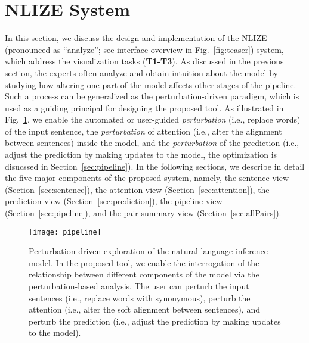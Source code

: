 

\section{NLIZE System}
In this section, we discuss the design and implementation of the NLIZE (pronounced as ``analyze''; see interface overview in Fig.~\ref{fig:teaser}) system, which address the visualization tasks (\textbf{T1-T3}).
%
As discussed in the previous section, the experts often analyze and obtain intuition about the model by studying how altering one part of the model affects other stages of the pipeline.
%
Such a process can be generalized as the perturbation-driven paradigm, which is used as a guiding principal for designing the proposed tool.
%
As illustrated in Fig.~\ref{fig:modelPipeline}, we enable the automated or user-guided \emph{perturbation} (i.e., replace words) of the input sentence, the \emph{perturbation} of attention (i.e., alter the alignment between sentences) inside the model, and the \emph{perturbation} of the prediction (i.e., adjust the prediction by making updates to the model, the optimization is disucssed in Section~\ref{sec:pipeline}).
%
In the following sections, we describe in detail the five major components of the proposed system, namely, the sentence view  (Section~\ref{sec:sentence}), the attention view (Section~\ref{sec:attention}), the prediction view (Section~\ref{sec:prediction}), the pipeline view (Section~\ref{sec:pipeline}), and the pair summary view (Section~\ref{sec:allPairs}).

\begin{figure}[htbp]
\vspace{-2mm}
\centering
 \texttt{[image: pipeline]}
 \vspace{-5mm}
 \caption{
 Perturbation-driven exploration of the natural language inference model.
 In the proposed tool, we enable the interrogation of the relationship between different components of the model via the perturbation-based analysis.
 The user can perturb the input sentences (i.e., replace words with synonymous), perturb the attention (i.e., alter the soft alignment between sentences), and perturb the prediction (i.e., adjust the prediction by making updates to the model).
}
\vspace{-2mm}
\label{fig:modelPipeline}
\end{figure}



%

